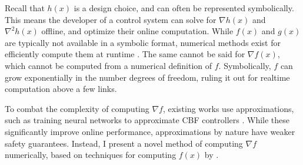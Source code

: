 \noindent Recall that $h(x)$ is a design choice, and can often be represented symbolically. This means the developer of a control system can solve for $\nabla h(x)$ and $\nabla^2 h(x)$ offline, and optimize their online computation. While $f(x)$ and $g(x)$ are typically not available in a symbolic format, numerical methods exist for efficiently compute them at runtime \cite{isenberg_2020, walker_orin_1982}. The same cannot be said for $\nabla f(x)$, which cannot be computed from a numerical definition of $f$. Symbolically, $f$ can grow exponentially in the number degrees of freedom, ruling it out for realtime computation above a few links. \newline

To combat the complexity of computing $\nabla f$, existing works use approximations, such as training neural networks to approximate CBF controllers \cite{Yaghoubi}. While these significantly improve online performance, approximations by nature have weaker safety guarantees. Instead, I present a novel method of computing $\nabla f$ numerically, based on techniques for computing $f(x)$ by \cite{isenberg_2020}.
